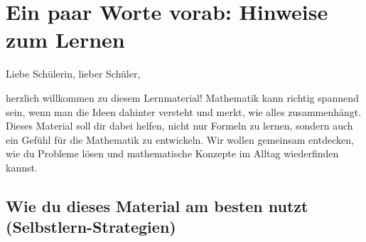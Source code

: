 \section{Ein paar Worte vorab: Hinweise zum Lernen} 

Liebe Schülerin, lieber Schüler,

herzlich willkommen zu diesem Lernmaterial! Mathematik kann richtig spannend sein, wenn man die Ideen dahinter versteht und merkt, wie alles zusammenhängt. Dieses Material soll dir dabei helfen, nicht nur Formeln zu lernen, sondern auch ein Gefühl für die Mathematik zu entwickeln. Wir wollen gemeinsam entdecken, wie du Probleme lösen und mathematische Konzepte im Alltag wiederfinden kannst.

\subsection*{Wie du dieses Material am besten nutzt (Selbstlern-Strategien)}

